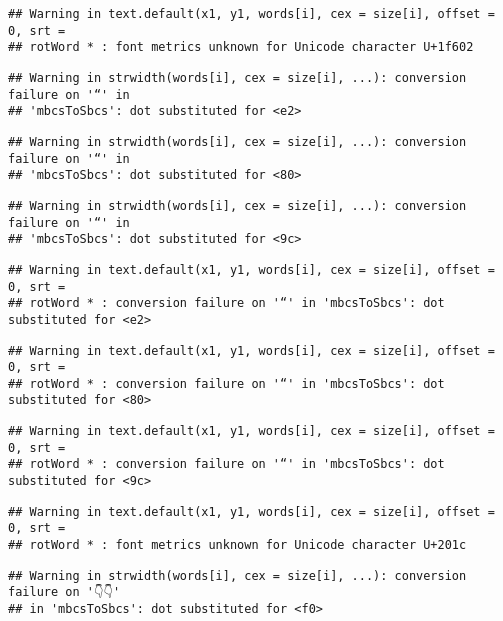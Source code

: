 \documentclass[
]{article}
\begin{document}
\begin{verbatim}
## Warning in text.default(x1, y1, words[i], cex = size[i], offset = 0, srt =
## rotWord * : font metrics unknown for Unicode character U+1f602
\end{verbatim}

\begin{verbatim}
## Warning in strwidth(words[i], cex = size[i], ...): conversion failure on '“' in
## 'mbcsToSbcs': dot substituted for <e2>
\end{verbatim}

\begin{verbatim}
## Warning in strwidth(words[i], cex = size[i], ...): conversion failure on '“' in
## 'mbcsToSbcs': dot substituted for <80>
\end{verbatim}

\begin{verbatim}
## Warning in strwidth(words[i], cex = size[i], ...): conversion failure on '“' in
## 'mbcsToSbcs': dot substituted for <9c>
\end{verbatim}

\begin{verbatim}
## Warning in text.default(x1, y1, words[i], cex = size[i], offset = 0, srt =
## rotWord * : conversion failure on '“' in 'mbcsToSbcs': dot substituted for <e2>
\end{verbatim}

\begin{verbatim}
## Warning in text.default(x1, y1, words[i], cex = size[i], offset = 0, srt =
## rotWord * : conversion failure on '“' in 'mbcsToSbcs': dot substituted for <80>
\end{verbatim}

\begin{verbatim}
## Warning in text.default(x1, y1, words[i], cex = size[i], offset = 0, srt =
## rotWord * : conversion failure on '“' in 'mbcsToSbcs': dot substituted for <9c>
\end{verbatim}

\begin{verbatim}
## Warning in text.default(x1, y1, words[i], cex = size[i], offset = 0, srt =
## rotWord * : font metrics unknown for Unicode character U+201c
\end{verbatim}

\begin{verbatim}
## Warning in strwidth(words[i], cex = size[i], ...): conversion failure on '👇👇'
## in 'mbcsToSbcs': dot substituted for <f0>
\end{verbatim}
\end{document}
